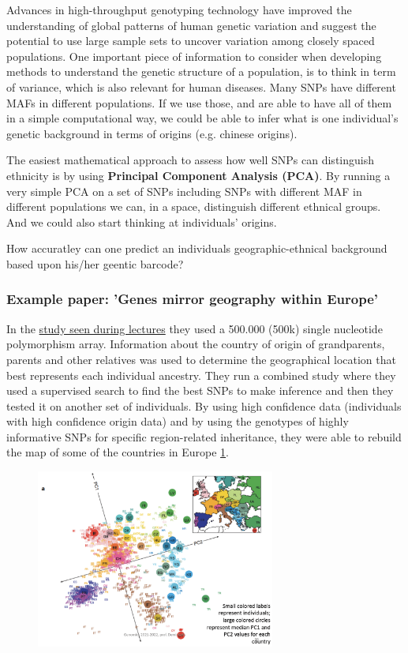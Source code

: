 Advances in high-throughput genotyping technology have improved the understanding of global patterns of human genetic variation and suggest the potential to use large sample sets to uncover variation among closely spaced populations.
One important piece of information to consider when developing methods to understand the genetic structure of a population, is to think in term of variance, which is also relevant for human diseases. 
Many SNPs have different MAFs in different populations. If we use those, and are able to have all of them in a simple computational way, we could be able to infer what is one individual's genetic background in terms of origins (e.g. chinese origins). 

The easiest mathematical approach to assess how well SNPs can distinguish ethnicity is by using \textbf{Principal Component Analysis (PCA)}. By running a very simple PCA on a set of SNPs including SNPs with different MAF in different populations we can, in a space, distinguish different ethnical groups. And we could also start thinking at individuals' origins. 

How accuratley can one predict an individuals geographic-ethnical background based upon his/her geentic barcode?

\subsubsection*{Example paper: 'Genes mirror geography within Europe'}

In the \href{https://www.ncbi.nlm.nih.gov/pmc/articles/PMC2735096/}{study seen during lectures} they used a 500.000 (500k) single nucleotide polymorphism array. Information about the country of origin of grandparents, parents and other relatives was used to determine the geographical location that best represents each individual ancestry. 
They run a combined study where they used a supervised search to find the best SNPs to make inference and then they tested it on another set of individuals. 
By using high confidence data (individuals with high confidence origin data) and by using the genotypes of highly informative SNPs for specific region-related inheritance, they were able to rebuild the map of some of the countries in Europe \ref*{fig:PCA_countries}. 

\begin{figure}
	\centering
	\includegraphics[width=0.7\textwidth]{Images/PCA.PNG}
	\caption{\label{fig:PCA_countries}}
\end{figure}

